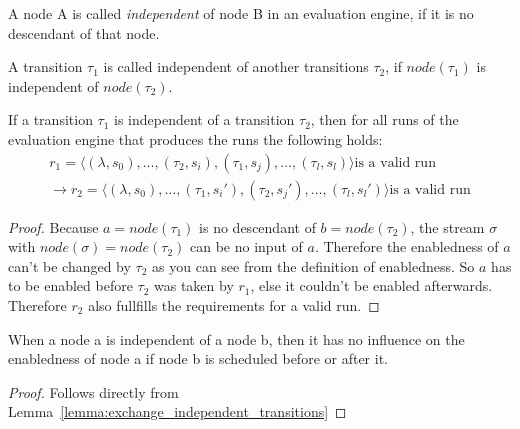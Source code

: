 \begin{definition}[name = Independence of Nodes]\label{def:node_independent}
  A node A is called \emph{independent} of node B in an evaluation engine, if it is no descendant of that node.
\end{definition}

\begin{definition}[name = Independence of Transitions]\label{def:independence_transitions}
  A transition \(\tau_1\) is called independent of another transitions \(\tau_2\), if \(\mathit{node}(\tau_1)\) is independent of \(\mathit{node}(\tau_2)\).
\end{definition}

\begin{lemma}[name = Exchange of Independent Transitions]\label{lemma:exchange_independent_transitions}
  If a transition \(\tau_1\) is independent of a transition \(\tau_2\), then for all runs of the evaluation engine that produces the runs the following holds:
  \begin{align*}
    r_1 = \langle (\lambda, s_0), \dots, (\tau_2, s_i), (\tau_1, s_j), \dots, (\tau_l, s_l) \rangle \text{is a valid run} \\
    \rightarrow r_2 = \langle (\lambda, s_0), \dots, (\tau_1, s_i'), (\tau_2, s_j'), \dots, (\tau_l, s_l') \rangle \text{is a valid run}
  \end{align*}
\end{lemma}

\begin{proof}
Because \(a = \mathit{node}(\tau_1)\) is no descendant of \(b = \mathit{node}(\tau_2)\), the stream \(\sigma\) with \(\mathit{node}(\sigma) = \mathit{node}(\tau_2)\) can be no input of \(a\).
  Therefore the enabledness of \(a\) can't be changed by \(\tau_2\) as you can see from the definition of enabledness.
  So \(a\) has to be enabled before \(\tau_2\) was taken by \(r_1\), else it couldn't be enabled afterwards.
  Therefore \(r_2\) also fullfills the requirements for a valid run.
\end{proof}

\begin{lemma}[name = Influence of Independent Nodes]\label{lemma:independent_nodes}
  When a node a is independent of a node b, then it has no influence on the enabledness of node a if node b is scheduled before or after it.
\end{lemma}

\begin{proof}
  Follows directly from Lemma~\ref{lemma:exchange_independent_transitions}
\end{proof}

